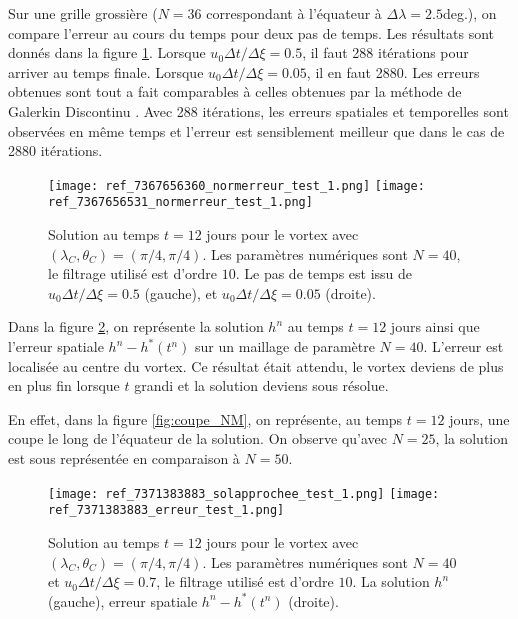 Sur une grille grossière ($N=36$ correspondant à l'équateur à $\Delta \lambda = 2.5$deg.), on compare l'erreur au cours du temps pour deux pas de temps. Les résultats sont donnés dans la figure \ref{fig:cfl_NM}. Lorsque $u_0 \Delta t / \Delta \xi = 0.5$, il faut 288 itérations pour arriver au temps finale. Lorsque $u_0 \Delta t / \Delta \xi = 0.05$, il en faut 2880. Les erreurs obtenues sont tout a fait comparables à celles obtenues par la méthode de Galerkin Discontinu \cite{Nair2008}. Avec 288 itérations, les erreurs spatiales et temporelles sont observées en même temps et l'erreur est sensiblement meilleur que dans le cas de 2880 itérations.

\begin{figure}[htbp]
\begin{center}
\texttt{[image: ref\_7367656360\_normerreur\_test\_1.png]}
\texttt{[image: ref\_7367656531\_normerreur\_test\_1.png]}
\end{center}
\caption{Solution au temps $t=12$ jours pour le vortex \cite{Nair2002} avec $(\lambda_C, \theta_C) = (\pi/4, \pi/4)$. Les paramètres numériques sont $N=40$, le filtrage utilisé est d'ordre $10$. Le pas de temps est issu de $u_0 \Delta t / \Delta \xi = 0.5$ (gauche), et $u_0 \Delta t / \Delta \xi = 0.05$ (droite).}
\label{fig:cfl_NM}
\end{figure}

Dans la figure \ref{fig:space_NM}, on représente la solution $h^n$ au temps $t=12$ jours ainsi que l'erreur spatiale $h^n-h^*(t^n)$ sur un maillage de paramètre $N=40$. L'erreur est localisée au centre du vortex. Ce résultat était attendu, le vortex deviens de plus en plus fin lorsque $t$ grandi et la solution deviens sous résolue. 

En effet, dans la figure \ref{fig:coupe_NM}, on représente, au temps $t=12$ jours, une coupe le long de l'équateur de la solution. On observe qu'avec $N=25$, la solution est sous représentée en comparaison à $N=50$.

\begin{figure}[htbp]
\begin{center}
\texttt{[image: ref\_7371383883\_solapprochee\_test\_1.png]}
\texttt{[image: ref\_7371383883\_erreur\_test\_1.png]}
\end{center}
\caption{Solution au temps $t=12$ jours pour le vortex \cite{Nair2002} avec $(\lambda_C, \theta_C) = (\pi/4, \pi/4)$. Les paramètres numériques sont $N=40$ et $u_0 \Delta t / \Delta \xi = 0.7$, le filtrage utilisé est d'ordre $10$. La solution $h^n$ (gauche), erreur spatiale $h^n - h^*(t^n)$ (droite).}
\label{fig:space_NM}
\end{figure}

